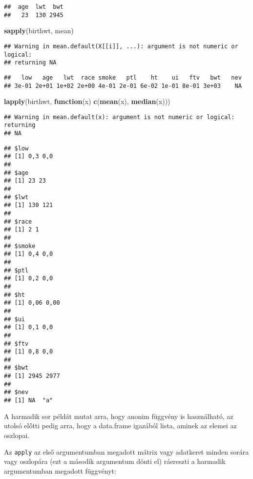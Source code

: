 \documentclass[]{book}
\newenvironment{Shaded}{\begin{snugshade}}{\end{snugshade}}
\newcommand{\ControlFlowTok}[1]{\textcolor[rgb]{0.13,0.29,0.53}{\textbf{#1}}}
\newcommand{\KeywordTok}[1]{\textcolor[rgb]{0.13,0.29,0.53}{\textbf{#1}}}
\newcommand{\NormalTok}[1]{#1}
\begin{document}
\begin{verbatim}
##  age  lwt  bwt 
##   23  130 2945
\end{verbatim}

\begin{Shaded}
\begin{Highlighting}[]
\KeywordTok{sapply}\NormalTok{(birthwt, mean)}
\end{Highlighting}
\end{Shaded}

\begin{verbatim}
## Warning in mean.default(X[[i]], ...): argument is not numeric or logical:
## returning NA
\end{verbatim}

\begin{verbatim}
##   low   age   lwt  race smoke   ptl    ht    ui   ftv   bwt   nev 
## 3e-01 2e+01 1e+02 2e+00 4e-01 2e-01 6e-02 1e-01 8e-01 3e+03    NA
\end{verbatim}

\begin{Shaded}
\begin{Highlighting}[]
\KeywordTok{lapply}\NormalTok{(birthwt, }\ControlFlowTok{function}\NormalTok{(x) }\KeywordTok{c}\NormalTok{(}\KeywordTok{mean}\NormalTok{(x), }\KeywordTok{median}\NormalTok{(x)))}
\end{Highlighting}
\end{Shaded}

\begin{verbatim}
## Warning in mean.default(x): argument is not numeric or logical: returning
## NA
\end{verbatim}

\begin{verbatim}
## $low
## [1] 0,3 0,0
## 
## $age
## [1] 23 23
## 
## $lwt
## [1] 130 121
## 
## $race
## [1] 2 1
## 
## $smoke
## [1] 0,4 0,0
## 
## $ptl
## [1] 0,2 0,0
## 
## $ht
## [1] 0,06 0,00
## 
## $ui
## [1] 0,1 0,0
## 
## $ftv
## [1] 0,8 0,0
## 
## $bwt
## [1] 2945 2977
## 
## $nev
## [1] NA  "a"
\end{verbatim}

A harmadik sor példát mutat arra, hogy anonim függvény is használható, az utolsó előtti pedig arra, hogy a data.frame igazából lista, aminek az elemei az oszlopai.

Az \texttt{apply} az első argumentumban megadott mátrix vagy adatkeret minden sorára vagy oszlopára (ezt a második argumentum dönti el) ráereszti a harmadik argumentumban megadott függvényt:
\end{document}
